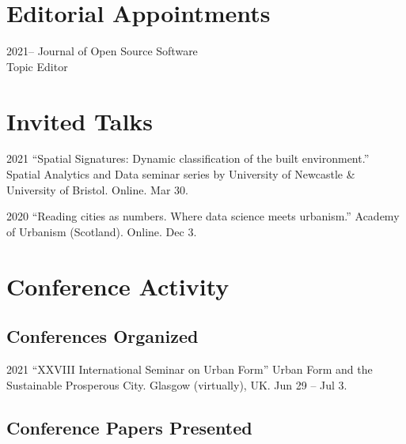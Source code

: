 \documentclass[12pt,a4paper]{report}
\begin{document}
    \section*{Editorial Appointments}

    \begin{tablist}

        \item[2021--] \tab{}Journal of Open Source Software \\
                            Topic Editor
    
    \end{tablist}

    \section*{Invited Talks}

    \begin{tablist}

        \item[2021] \tab{}\enquote{Spatial Signatures: Dynamic classification of the built environment.} Spatial Analytics and Data seminar series by University of Newcastle & University of Bristol. Online. Mar 30.

        \item[2020] \tab{}\enquote{Reading cities as numbers. Where data science meets urbanism.} Academy of Urbanism (Scotland). Online. Dec 3.

    \end{tablist}


    \section*{Conference Activity}


    \subsection*{Conferences Organized}

    \begin{tablist}

        \item[2021] \tab{}\enquote{XXVIII International Seminar on Urban Form} Urban Form and the Sustainable Prosperous City. Glasgow (virtually), UK. Jun 29 -- Jul 3.

    \end{tablist}

    \subsection*{Conference Papers Presented}
\end{document}
